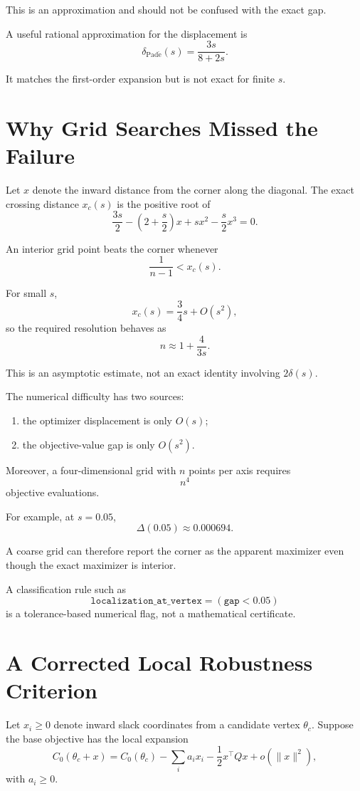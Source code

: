 \documentclass[11pt]{article}
\theoremstyle{remark}
\begin{document}
This is an approximation and should not be confused with the exact gap.

A useful rational approximation for the displacement is
\[
\delta_{\mathrm{Pad\acute e}}(s)=\frac{3s}{8+2s}.
\]

It matches the first-order expansion but is not exact for finite $s$.

\section{Why Grid Searches Missed the Failure}

Let $x$ denote the inward distance from the corner along the diagonal. The
exact crossing distance $x_c(s)$ is the positive root of
\[
\frac{3s}{2}
-\left(2+\frac{s}{2}\right)x
+sx^2-\frac{s}{2}x^3
=0.
\]

An interior grid point beats the corner whenever
\[
\frac{1}{n-1}<x_c(s).
\]

For small $s$,
\[
x_c(s)=\frac34s+O(s^2),
\]
so the required resolution behaves as
\[
n\approx 1+\frac{4}{3s}.
\]

This is an asymptotic estimate, not an exact identity involving
$2\delta(s)$.

The numerical difficulty has two sources:

\begin{enumerate}
    \item the optimizer displacement is only $O(s)$;
    \item the objective-value gap is only $O(s^2)$.
\end{enumerate}

Moreover, a four-dimensional grid with $n$ points per axis requires
\[
n^4
\]
objective evaluations.

For example, at $s=0.05$,
\[
\Delta(0.05)\approx 0.000694.
\]

A coarse grid can therefore report the corner as the apparent maximizer even
though the exact maximizer is interior.

A classification rule such as
\[
\texttt{localization\_at\_vertex}=(\texttt{gap}<0.05)
\]
is a tolerance-based numerical flag, not a mathematical certificate.

\section{A Corrected Local Robustness Criterion}

Let $x_i\geq0$ denote inward slack coordinates from a candidate vertex
$\theta_c$. Suppose the base objective has the local expansion
\[
C_0(\theta_c+x)
=
C_0(\theta_c)
-\sum_i a_i x_i
-\frac12x^\top Qx
+o(\|x\|^2),
\]
with $a_i\geq0$.
\end{document}
